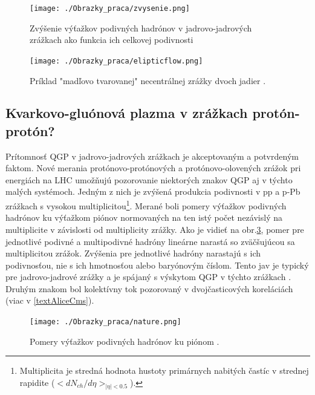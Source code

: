 \documentclass[thesismargins, thesislinespacing]{rnthesis}
\begin{document}
\begin{figure}[hbtp!]
	\begin{center}
		\texttt{[image: ./Obrazky\_praca/zvysenie.png]}
		\caption{ Zvýšenie výťažkov podivných hadrónov v jadrovo-jadrových zrážkach ako funkcia ich celkovej podivnosti \cite{zvysenie}}
		\label{zvysenie}
	\end{center}
\end{figure}  

\begin{figure}[hbtp!]
	\begin{center}
		\texttt{[image: ./Obrazky\_praca/elipticflow.png]}
		\caption{ Príklad "madľovo tvarovanej" necentrálnej zrážky dvoch jadier \cite{elflow}.}
		\label{elflow}
	\end{center}
\end{figure}  

\subsection{Kvarkovo-gluónová plazma v zrážkach protón-protón?}
Prítomnosť QGP v jadrovo-jadrových zrážkach je akceptovaným a potvrdeným faktom. Nové merania protónovo-protónových a protónovo-olovených zrážok pri energiách na LHC umožňujú pozorovanie niektorých znakov QGP aj v týchto malých systémoch. Jedným z nich je zvýšená produkcia podivnosti v pp a p-Pb zrážkach s vysokou multiplicitou\footnote{Multiplicita je stredná hodnota hustoty primárnych nabitých častíc v strednej rapidite   \newline  ($<dN_{ch}/d\eta>_{|\eta|<0.5}$).}. Merané boli pomery výťažkov podivných hadrónov ku výťažkom piónov normovaných na ten istý počet nezávislý na multiplicite v závislosti od multiplicity zrážky. Ako je vidieť na obr.\ref{strange}, pomer pre jednotlivé podivné a  multipodivné hadróny lineárne narastá so zväčšujúcou sa multiplicitou zrážok. Zvýšenia pre jednotlivé hadróny narastajú s ich podivnosťou, nie s ich hmotnosťou alebo baryónovým číslom. Tento jav je typický pre jadrovo-jadrové zrážky a je spájaný s výskytom QGP v týchto zrážkach \cite{nature}.  Druhým znakom bol kolektívny tok pozorovaný v dvojčasticových koreláciách (viac v \ref{textAliceCms}).
\begin{figure}[hbtp!]
	\begin{center}
		\texttt{[image: ./Obrazky\_praca/nature.png]}
		\caption{ Pomery výťažkov podivných hadrónov ku piónom \cite{nature}.}
		\label{strange}
	\end{center}
\end{figure} 
\end{document}
